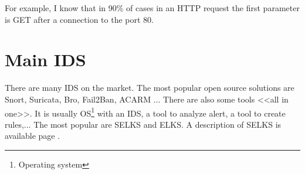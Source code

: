 For example, I know that in 90\% of cases in an HTTP request the first parameter is GET after a connection to the
port 80.



\section{Main IDS}

There are many IDS on the market. The most popular open source solutions are Snort, Suricata, Bro, Fail2Ban, ACARM
... There are also some tools <<all in one>>. It is usually OS\footnote{Operating system} with an IDS, a tool to
analyze alert, a tool to create rules,... The most popular are SELKS and ELKS. A description of SELKS is available
page \pageref{chap:selks}.




